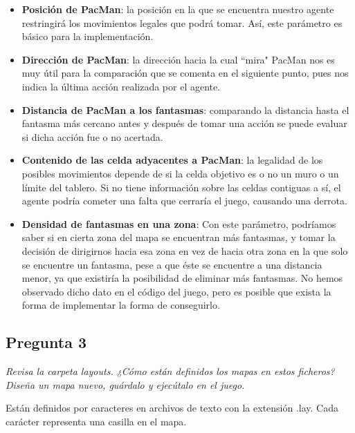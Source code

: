 \documentclass[12pt]{article}
\begin{document}
\begin{itemize}
    \item \textbf{Posición de PacMan}: la posición en la que se encuentra
    nuestro agente restringirá los movimientos legales que podrá tomar. Así,
    este parámetro es básico para la implementación.
    \item \textbf{Dirección de PacMan}: la dirección hacia la cual ``mira"
    PacMan nos es muy útil para la comparación que se comenta en el siguiente
    punto, pues nos indica la última acción realizada por el agente.
    \item \textbf{Distancia de PacMan a los fantasmas}: comparando la distancia
    hasta el fantasma más cercano antes y después de tomar una acción se puede
    evaluar si dicha acción fue o no acertada.
    \item \textbf{Contenido de las celda adyacentes a PacMan}: la legalidad de
    los posibles movimientos depende de si la celda objetivo es o no un muro o
    un límite del tablero. Si no tiene información sobre las celdas contiguas a
    sí, el agente podría cometer una falta que cerraría el juego, causando una
    derrota.
    \item \textbf{Densidad de fantasmas en una zona}: Con este parámetro,
    podríamos saber si en cierta zona del mapa se encuentran más fantasmas, y
    tomar la decisión de dirigirnos hacia esa zona en vez de hacia otra zona en
    la que solo se encuentre un fantasma, pese a que éste se encuentre a una
    distancia menor, ya que existiría la posibilidad de eliminar más fantasmas.
    No hemos observado dicho dato en el código del juego, pero es posible que
    exista la forma de implementar la forma de conseguirlo.
\end{itemize}


\newpage
\begin{center}
\section{Pregunta 3}

\emph{Revisa la carpeta layouts. ¿Cómo están definidos los mapas en estos
ficheros? Diseña un mapa nuevo, guárdalo y ejecútalo en el juego.}
\end{center}

Están definidos por caracteres en archivos de texto con la extensión .lay.
 Cada carácter representa una casilla en el mapa.
\end{document}
